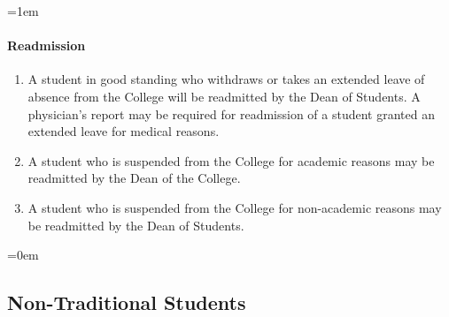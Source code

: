 \documentclass{manual}
\newcommand{\oldbreak}[1]{}
\let\oldsubsection\subsection
\renewcommand\subsection{\leftskip=0em\oldsubsection}
\let\oldparagraph\paragraph
\renewcommand\paragraph{\leftskip=1em\oldparagraph}
\begin{document}
\paragraph{Readmission}
\begin{enumerate}[label=\alph*)]
\item A student in good standing who withdraws or takes an extended leave of absence from the College will be readmitted by the Dean of Students. A physician's report may be required for readmission of a student granted an extended leave for medical reasons.

\item A student who is suspended from the College for academic reasons may be readmitted by the Dean of the College.

\item A student who is suspended from the College for non-academic reasons may be readmitted by the Dean of Students.
\end{enumerate}

\oldbreak{IX-3}

\subsection{Non-Traditional Students}\label{sec:NonTraditionalStudents}
\end{document}
